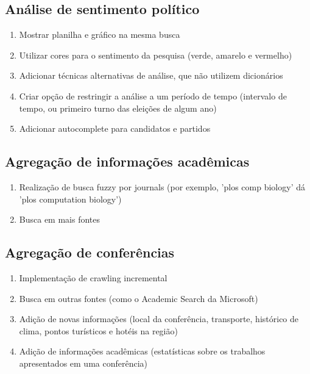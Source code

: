 \subsection{Análise de sentimento político}
\begin{enumerate}
\item Mostrar planilha e gráfico na mesma busca
\item Utilizar cores para o sentimento da pesquisa (verde, amarelo e vermelho)
\item Adicionar técnicas alternativas de análise, que não utilizem dicionários
\item Criar opção de restringir a análise a um período de tempo (intervalo de tempo, ou primeiro turno das eleições de algum ano)
\item Adicionar autocomplete para candidatos e partidos
\end{enumerate}

\subsection{Agregação de informações acadêmicas}
\begin{enumerate}
\item Realização de busca fuzzy por journals (por exemplo, 'plos comp biology' dá 'plos computation biology')
\item Busca em mais fontes
\end{enumerate}

\subsection{Agregação de conferências}
\begin{enumerate}
\item Implementação de crawling incremental
\item Busca em outras fontes (como o Academic Search da Microsoft)
\item Adição de novas informações (local da conferência, transporte, histórico de clima, pontos turísticos e hotéis na região)
\item Adição de informações acadêmicas (estatísticas sobre os trabalhos apresentados em uma conferência)
\end{enumerate}